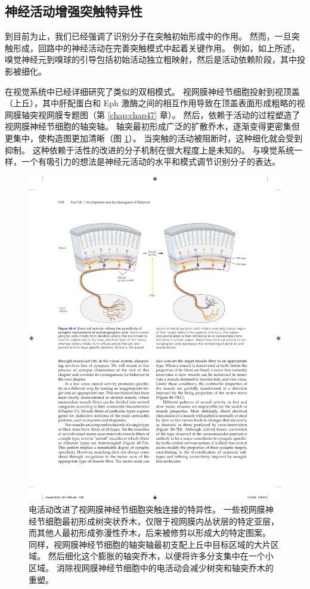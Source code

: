 \subsection{神经活动增强突触特异性}
到目前为止，我们已经强调了识别分子在突触初始形成中的作用。 然而，一旦突触形成，回路中的神经活动在完善突触模式中起着关键作用。 例如，如上所述，嗅觉神经元到嗅球的引导包括初始活动独立粗映射，然后是活动依赖阶段，其中投影被细化。

在视觉系统中已经详细研究了类似的双相模式。 视网膜神经节细胞投射到视顶盖（上丘），其中肝配蛋白和 Eph 激酶之间的相互作用导致在顶盖表面形成粗略的视网膜轴突视网膜专题图（第 \ref{chap:chap47} 章）。 然后，依赖于活动的过程塑造了视网膜神经节细胞的轴突轴。 
轴突最初形成广泛的扩散乔木，逐渐变得更密集但更集中，使构造图更加清晰（图 \ref{fig:48_6}）。 
当突触的活动被阻断时，这种细化就会受到抑制。 这种依赖于活性的改进的分子机制在很大程度上是未知的。 与嗅觉系统一样，一个有吸引力的想法是神经元活动的水平和模式调节识别分子的表达。

\begin{figure}[htbp]
	\centering
	\includegraphics[width=0.9\linewidth]{chap48/fig_48_6}
	\caption{电活动改进了视网膜神经节细胞突触连接的特异性。 一些视网膜神经节细胞最初形成树突状乔木，仅限于视网膜内丛状层的特定亚层，而其他人最初形成弥漫性乔木，后来被修剪以形成大的特定图案。 同样，视网膜神经节细胞的轴突轴最初支配上丘中目标区域的大片区域。 然后细化这个膨胀的轴突乔木，以便将许多分支集中在一个小区域。 消除视网膜神经节细胞中的电活动会减少树突和轴突乔木的重塑。}
	\label{fig:48_6}
\end{figure}

